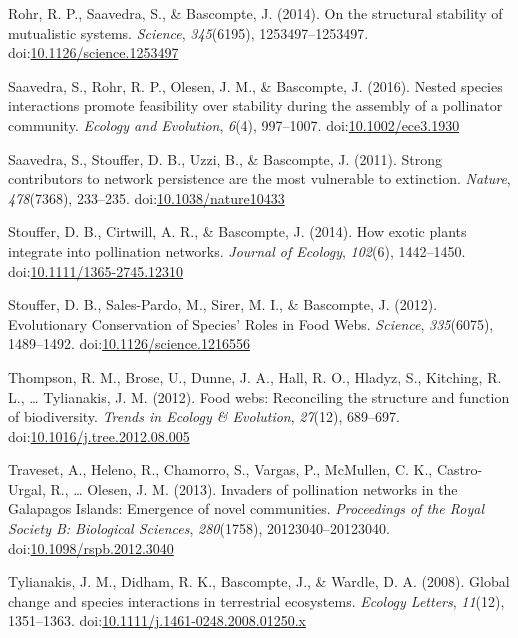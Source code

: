 \documentclass[a4paper]{artikel1}
\theoremstyle{definition}
\theoremstyle{definition}
\theoremstyle{definition}
\theoremstyle{remark}
\begin{document}
\hypertarget{ref-rohr_structural_2014}{}
Rohr, R. P., Saavedra, S., \& Bascompte, J. (2014). On the structural
stability of mutualistic systems. \emph{Science}, \emph{345}(6195),
1253497--1253497.
doi:\href{https://doi.org/10.1126/science.1253497}{10.1126/science.1253497}

\hypertarget{ref-saavedra_nested_2016}{}
Saavedra, S., Rohr, R. P., Olesen, J. M., \& Bascompte, J. (2016).
Nested species interactions promote feasibility over stability during
the assembly of a pollinator community. \emph{Ecology and Evolution},
\emph{6}(4), 997--1007.
doi:\href{https://doi.org/10.1002/ece3.1930}{10.1002/ece3.1930}

\hypertarget{ref-saavedra_strong_2011}{}
Saavedra, S., Stouffer, D. B., Uzzi, B., \& Bascompte, J. (2011). Strong
contributors to network persistence are the most vulnerable to
extinction. \emph{Nature}, \emph{478}(7368), 233--235.
doi:\href{https://doi.org/10.1038/nature10433}{10.1038/nature10433}

\hypertarget{ref-stouffer_how_2014}{}
Stouffer, D. B., Cirtwill, A. R., \& Bascompte, J. (2014). How exotic
plants integrate into pollination networks. \emph{Journal of Ecology},
\emph{102}(6), 1442--1450.
doi:\href{https://doi.org/10.1111/1365-2745.12310}{10.1111/1365-2745.12310}

\hypertarget{ref-stouffer_evolutionary_2012}{}
Stouffer, D. B., Sales-Pardo, M., Sirer, M. I., \& Bascompte, J. (2012).
Evolutionary Conservation of Species' Roles in Food Webs.
\emph{Science}, \emph{335}(6075), 1489--1492.
doi:\href{https://doi.org/10.1126/science.1216556}{10.1126/science.1216556}

\hypertarget{ref-thompson_food_2012}{}
Thompson, R. M., Brose, U., Dunne, J. A., Hall, R. O., Hladyz, S.,
Kitching, R. L., \ldots{} Tylianakis, J. M. (2012). Food webs:
Reconciling the structure and function of biodiversity. \emph{Trends in
Ecology \& Evolution}, \emph{27}(12), 689--697.
doi:\href{https://doi.org/10.1016/j.tree.2012.08.005}{10.1016/j.tree.2012.08.005}

\hypertarget{ref-traveset_invaders_2013}{}
Traveset, A., Heleno, R., Chamorro, S., Vargas, P., McMullen, C. K.,
Castro-Urgal, R., \ldots{} Olesen, J. M. (2013). Invaders of pollination
networks in the Galapagos Islands: Emergence of novel communities.
\emph{Proceedings of the Royal Society B: Biological Sciences},
\emph{280}(1758), 20123040--20123040.
doi:\href{https://doi.org/10.1098/rspb.2012.3040}{10.1098/rspb.2012.3040}

\hypertarget{ref-tylianakis_global_2008}{}
Tylianakis, J. M., Didham, R. K., Bascompte, J., \& Wardle, D. A.
(2008). Global change and species interactions in terrestrial
ecosystems. \emph{Ecology Letters}, \emph{11}(12), 1351--1363.
doi:\href{https://doi.org/10.1111/j.1461-0248.2008.01250.x}{10.1111/j.1461-0248.2008.01250.x}
\end{document}
